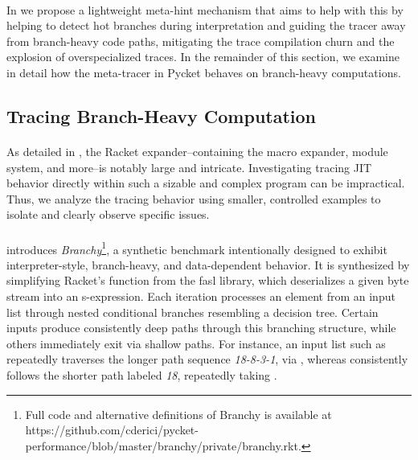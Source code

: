 		\paragraph{}%
			In  we propose a lightweight meta-hint mechanism that aims to help with this by helping to detect hot branches during interpretation and guiding the tracer away from branch-heavy code paths, mitigating the trace compilation churn and the explosion of overspecialized traces. In the remainder of this section, we examine in detail how the meta-tracer in Pycket behaves on branch-heavy computations.

		\subsection{Tracing Branch-Heavy Computation}
			\label{section:branchy}

			\paragraph{}%
				As detailed in , the Racket expander--containing the macro expander, module system, and more--is notably large and intricate. Investigating tracing JIT behavior directly within such a sizable and complex program can be impractical. Thus, we analyze the tracing behavior using smaller, controlled examples to isolate and clearly observe specific issues.


			\paragraph{}%
				 introduces \emph{Branchy}\footnote{Full code and alternative definitions of Branchy is available at https://github.com/cderici/pycket-performance/blob/master/branchy/private/branchy.rkt.}, a synthetic benchmark intentionally designed to exhibit interpreter-style, branch-heavy, and data-dependent behavior. It is synthesized by simplifying Racket's  function from the \gls{fasl} library, which deserializes a given byte stream into an s-expression. Each iteration processes an element from an input list through nested conditional branches resembling a decision tree. Certain inputs produce consistently deep paths through this branching structure, while others immediately exit via shallow paths. For instance, an input list such as  repeatedly traverses the longer path sequence \emph{18-8-3-1}, via , whereas  consistently follows the shorter path labeled \emph{18}, repeatedly taking .

